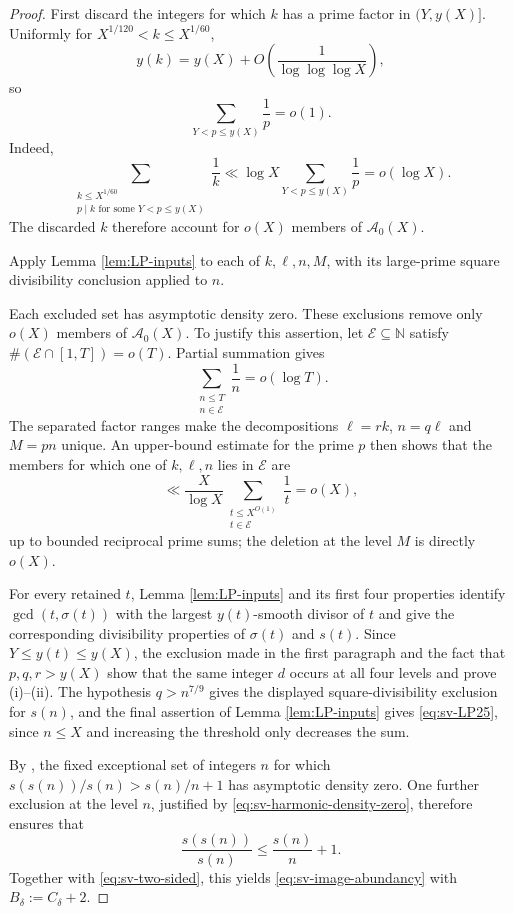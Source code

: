 \documentclass[11pt,letterpaper,reqno]{amsart}
\numberwithin{equation}{section}
\theoremstyle{remark}
\newcommand{\N}{\mathbb{N}}
\renewcommand{\leq}{\leqslant}
\begin{document}
\begin{proof}
First discard the integers for which $k$ has a prime factor in
$(Y,y(X)]$. Uniformly for $X^{1/120}<k\leq X^{1/60}$,
\[
 y(k)=y(X)+O\!\left(\frac1{\log\log\log X}\right),
\]
so
\[
 \sum_{Y<p\leq y(X)}\frac1p=o(1).
\]
Indeed,
\[
 \sum_{\substack{k\leq X^{1/60}\\
 p\mid k\text{ for some }Y<p\leq y(X)}}\frac1k
 \ll \log X\sum_{Y<p\leq y(X)}\frac1p=o(\log X).
\]
The discarded $k$ therefore account for $o(X)$ members of
$\mathcal{A}_0(X)$.

Apply Lemma \ref{lem:LP-inputs} to each of $k,\ell,n,M$, with its
large-prime square divisibility conclusion applied to $n$.

Each excluded set has asymptotic density zero. These exclusions remove only
$o(X)$ members of $\mathcal{A}_0(X)$. To justify this assertion, let
$\mathcal{E}\subseteq\N$ satisfy
$\#(\mathcal{E}\cap[1,T])=o(T)$. Partial summation gives
\begin{equation}\label{eq:sv-harmonic-density-zero}
 \sum_{\substack{n\leq T\\n\in\mathcal{E}}}\frac1n=o(\log T).
\end{equation}
The separated factor ranges make the decompositions
$\ell=rk$, $n=q\ell$ and $M=pn$ unique. An upper-bound estimate for the
prime $p$ then shows that the members for which one of $k,\ell,n$ lies in
$\mathcal{E}$ are
\[
 \ll\frac{X}{\log X}
 \sum_{\substack{t\leq X^{O(1)}\\t\in\mathcal{E}}}\frac1t=o(X),
\]
up to bounded reciprocal prime sums; the deletion at the level $M$ is
directly $o(X)$.

For every retained $t$, Lemma \ref{lem:LP-inputs} and its first four
properties identify $\gcd(t,\sigma(t))$ with the largest $y(t)$-smooth
divisor of $t$ and give the corresponding divisibility properties of
$\sigma(t)$ and $s(t)$. Since $Y\leq y(t)\leq y(X)$, the exclusion made in
the first paragraph and the fact that $p,q,r>y(X)$ show that the same integer
$d$ occurs at all four levels and prove \textup{(i)--(ii)}. The hypothesis
$q>n^{7/9}$ gives the displayed square-divisibility exclusion for $s(n)$,
and the final assertion of Lemma \ref{lem:LP-inputs} gives
\eqref{eq:sv-LP25}, since $n\leq X$ and increasing the threshold only
decreases the sum.

By \cite[Theorem~1.4]{Pollack}, the fixed exceptional set of integers $n$
for which $s(s(n))/s(n)>s(n)/n+1$ has asymptotic density zero.
One further exclusion at the level $n$, justified by
\eqref{eq:sv-harmonic-density-zero}, therefore ensures that
\[
 \frac{s(s(n))}{s(n)}
 \leq \frac{s(n)}n+1.
\]
Together with \eqref{eq:sv-two-sided}, this yields
\eqref{eq:sv-image-abundancy} with $B_\delta:=C_\delta+2$.
\end{proof}
\end{document}
